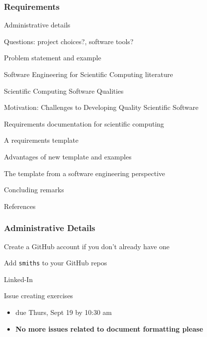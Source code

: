 \documentclass[t,12pt,numbers,fleqn]{beamer}
\begin{document}



\begin{frame}
\frametitle{Requirements}

\bi
\item Administrative details
\item Questions: project choices?, software tools?
\item Problem statement and example
\item Software Engineering for Scientific Computing literature
\item Scientific Computing Software Qualities
\item Motivation: Challenges to Developing Quality Scientific Software
\item Requirements documentation for scientific computing
\item A requirements template
\item Advantages of new template and examples
\item The template from a software engineering perspective
\item Concluding remarks
\item References
\ei
\end{frame}


\begin{frame}
\frametitle{Administrative Details}

\bi
\item Create a GitHub account if you don't already have one
\item Add \texttt{smiths} to your GitHub repos
\item Linked-In
\item {}
\item Issue creating exercises
  \begin{itemize}
  \item due Thurs, Sept 19 by 10:30 am
  \item \textbf{No more issues related to document formatting please}
  \end{itemize}
\ei

\end{frame}
\end{document}
